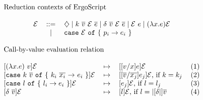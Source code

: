 \begin{center}
\(\begin{array}{c}
\multicolumn{1}{l}{\text{Reduction contexts of \langname}}\\
\\
\begin{tabular}{@{}l c l}
$\Ctx$ 	& ::= 	& 	$\Hole \mid k~\Ov{v}~\Ctx~\Ov{e} \mid \delta~\Ov{v}~\Ctx~\Ov{e} \mid \Ctx~e \mid (\Lam{x}{e})\Ctx  $ \\
		& $\mid$ &	\lst{case} $\Ctx$ \lst{of} \{ $p_i \rightarrow e_i$ \}				\\
		& & \\
\end{tabular} \\
\multicolumn{1}{l}{\text{Call-by-value evaluation relation}}\\
\\
\begin{tabular}{@{}l c l r}
$[(\Lam{x}{e})~v]\Ctx$   & $\mapsto$ 	& 	$[[v/x]e]\Ctx$					    & (1)     \\
$[$\lst{case} $k~\Ov{v}$ \lst{of} \{ $k_i~\overline{x_i}$ $\rightarrow$ $e_i$  \}$]\Ctx$   & $\mapsto$ 	& 	$[[\overline{v}/\overline{x_j}]e_j]\Ctx$, if $k = k_j$	& (2)    \\
$[$\lst{case} $l$ \lst{of} \{ $l_i \rightarrow e_i$ \}$]\Ctx$   & $\mapsto$ 	& 	$[e_j]\Ctx$, if $l = l_j$	& (3)    \\
$[\delta~\overline{v}]\Ctx$   & $\mapsto$ 	& 	$[l]\Ctx$, if $l = |[\Prim|]\overline{v}$					    & (4)     \\

\end{tabular}
\end{array}\)
\end{center}
